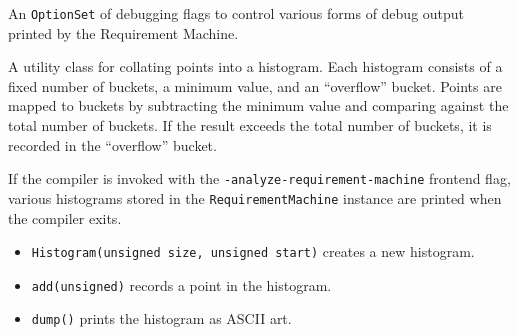 \documentclass[../generics]{subfiles}
\begin{document}
An \texttt{OptionSet} of debugging flags to control various forms of debug output printed by the Requirement Machine.

%
A utility class for collating points into a histogram. Each histogram consists of a fixed number of buckets, a minimum value, and an ``overflow'' bucket. Points are mapped to buckets by subtracting the minimum value and comparing against the total number of buckets. If the result exceeds the total number of buckets, it is recorded in the ``overflow'' bucket.

If the compiler is invoked with the \texttt{-analyze-requirement-machine} frontend flag, various histograms stored in the \texttt{RequirementMachine} instance are printed when the compiler exits.
\begin{itemize}
\item \texttt{Histogram(unsigned size, unsigned start)} creates a new histogram.
\item \texttt{add(unsigned)} records a point in the histogram.
\item \texttt{dump()} prints the histogram as ASCII art.
\end{itemize}
\end{document}
